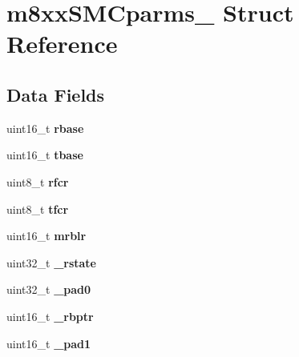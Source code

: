 \hypertarget{structm8xxSMCparms__}{}\section{m8xx\+S\+M\+Cparms\+\_\+ Struct Reference}
\label{structm8xxSMCparms__}
\subsection*{Data Fields}
\begin{DoxyCompactItemize}
\item 
\mbox{\label{structm8xxSMCparms___a4ac5b23dd3533a86598ce75077ecce6d}} 
uint16\+\_\+t {\bfseries rbase}
\item 
\mbox{\label{structm8xxSMCparms___aa6acf6530943a2d6baa34d750a50a6c5}} 
uint16\+\_\+t {\bfseries tbase}
\item 
\mbox{\label{structm8xxSMCparms___a18e5b93707780027695b73e77291cff9}} 
uint8\+\_\+t {\bfseries rfcr}
\item 
\mbox{\label{structm8xxSMCparms___a363360034e36a91b5f3f2a031e48bd4a}} 
uint8\+\_\+t {\bfseries tfcr}
\item 
\mbox{\label{structm8xxSMCparms___a4dbdbeedf383ed2bdb425cc34735907f}} 
uint16\+\_\+t {\bfseries mrblr}
\item 
\mbox{\label{structm8xxSMCparms___affac1a7eb4e4488c00e05bc2ecf1f958}} 
uint32\+\_\+t {\bfseries \+\_\+rstate}
\item 
\mbox{\label{structm8xxSMCparms___aba5fe01f349e4e47eeccd65f3d13cbd9}} 
uint32\+\_\+t {\bfseries \+\_\+pad0}
\item 
\mbox{\label{structm8xxSMCparms___ad396e65f9341aa923f48f97077170111}} 
uint16\+\_\+t {\bfseries \+\_\+rbptr}
\item 
\mbox{\label{structm8xxSMCparms___a3c3d71d54c9e134ec19e2d07453e25b5}} 
uint16\+\_\+t {\bfseries \+\_\+pad1}
\item 
\mbox{\label{structm8xxSMCparms___a6577f2023d03cca7ba436785e8573206}} 

\end{DoxyCompactItemize}

